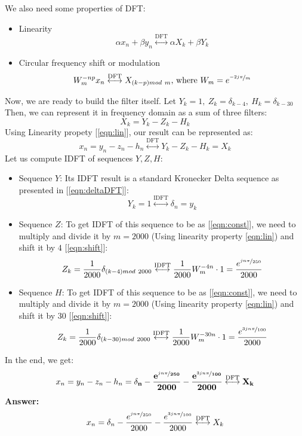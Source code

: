 \documentclass{article}
\begin{document}
We also need some properties of DFT:
\begin{itemize}
    \item Linearity
    \begin{equation}
    \label{eqn:lin}
        \alpha x_n + \beta y_n \stackrel{\mathrm{DFT}}{\longleftrightarrow} \alpha X_k + \beta Y_k
    \end{equation}
    \item Circular frequency shift or modulation
    \begin{equation}
    \label{eqn:shift}
        W_m^{-np}x_n \stackrel{\mathrm{DFT}}{\longleftrightarrow} X_{(k-p)mod\ m}\text{, where }W_m = e^{\nicefrac{-2j\pi}{m}}
    \end{equation}
\end{itemize}
Now, we are ready to build the filter itself. Let $Y_k = 1,\ Z_k = \delta_{k-4},\ H_k = \delta_{k-30}$ Then, we can represent it in frequency domain as a sum of three filters:
$$X_k = Y_k - Z_k - H_k$$
Using Linearity propety [\ref{eqn:lin}], our result can be represented as:
$$x_n = y_n - z_n - h_n \stackrel{\mathrm{DFT}}{\longleftrightarrow} Y_k - Z_k - H_k = X_k$$
Let us compute IDFT of sequences $Y, Z, H$:
\begin{itemize}
    \item Sequence $Y$: Its IDFT result is a standard Kronecker Delta sequence as presented in [\ref{eqn:deltaDFT}]:
    $$Y_k = 1 \stackrel{\mathrm{IDFT}}{\longleftrightarrow} \delta_n = y_k$$
    \item Sequence $Z$: To get IDFT of this sequence to be as [\ref{eqn:const}], we need to multiply and divide it by $m=2000$ (Using linearity property \ref{eqn:lin}) and shift it by $4$ [\ref{eqn:shift}]:
    $$Z_k = \frac{1}{2000}\delta_{(k-4)mod\ 2000} \stackrel{\mathrm{IDFT}}{\longleftrightarrow} \frac{1}{2000} W_m^{-4n} \cdot 1 = \frac{e^{\nicefrac{jn\pi}{250}}}{2000}$$
    \item Sequence $H$: To get IDFT of this sequence to be as [\ref{eqn:const}], we need to multiply and divide it by $m=2000$ (Using linearity property \ref{eqn:lin}) and shift it by $30$ [\ref{eqn:shift}]:
    $$Z_k = \frac{1}{2000}\delta_{(k-30)mod\ 2000} \stackrel{\mathrm{IDFT}}{\longleftrightarrow} \frac{1}{2000} W_m^{-30n} \cdot 1 = \frac{e^{\nicefrac{3jn\pi}{100}}}{2000}$$
\end{itemize}
In the end, we get:
$$
x_n = y_n - z_n - h_n = \mathbf{\delta_n - \frac{e^{\nicefrac{jn\pi}{250}}}{2000} - \frac{e^{\nicefrac{3jn\pi}{100}}}{2000}} \stackrel{\mathrm{DFT}}{\longleftrightarrow} \mathbf{X_k}
$$
\textbf{Answer:}
$$
x_n = \delta_n - \frac{e^{\nicefrac{jn\pi}{250}}}{2000} - \frac{e^{\nicefrac{3jn\pi}{100}}}{2000} \stackrel{\mathrm{DFT}}{\longleftrightarrow} X_k
$$
\end{document}
